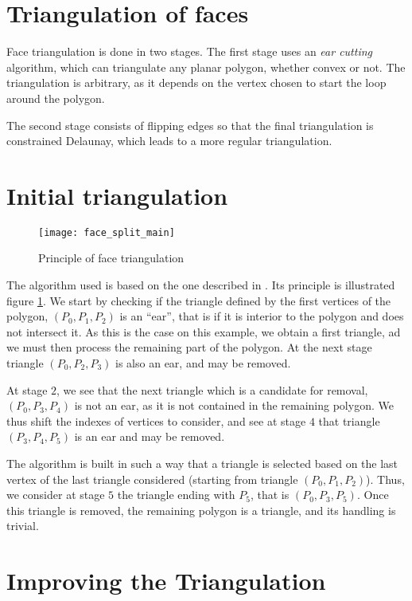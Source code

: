 \section*{Triangulation of faces\label{sec:triangle}}

Face triangulation is done in two
stages. The first stage uses an \emph{ear cutting} algorithm, which
can triangulate any planar polygon, whether convex or not.
The triangulation is arbitrary, as it depends on the vertex chosen
to start the loop around the polygon.

The second stage consists of flipping edges so that the final
triangulation is constrained Delaunay, which leads to a
more regular triangulation.

\section*{Initial triangulation\label{sec:triangle_ini}}

\begin{figure}[!h]
\centerline{
\texttt{[image: face\_split\_main]}}
\caption{Principle of face triangulation}
\label{fig:algo.ear_splitting}
\end{figure}

The algorithm used is based on the one described in \cite{Theussl:1998}.
Its principle is illustrated figure \ref{fig:algo.ear_splitting}.
We start by checking if the triangle defined by the first vertices
of the polygon, $(P_0, P_1, P_2)$ is an ``ear'', that is if it is
interior to the polygon and does not intersect it. As this is the case
on this example, we obtain a first triangle, ad we must then process
the remaining part of the polygon. At the next stage triangle
$(P_0, P_2, P_3)$ is also an ear, and may be removed.

At stage $2$, we see that the next triangle which is a candidate for
removal, $(P_0, P_3, P_4)$ is not an ear, as it is not contained in the
remaining polygon. We thus shift the indexes of vertices to consider,
and see at stage $4$ that triangle $(P_3, P_4, P_5)$
is an ear and may be removed.

The algorithm is built in such a way that a triangle is selected based on
the last vertex of the last triangle considered (starting from triangle
$(P_0, P_1, P_2)$). Thus, we consider at stage $5$ the triangle ending
with $P_5$, that is $(P_0, P_3, P_5)$.
Once this triangle is removed, the remaining polygon is a triangle,
and its handling is trivial.

\section*{Improving the Triangulation\label{sec:triangle_delaunay}}

